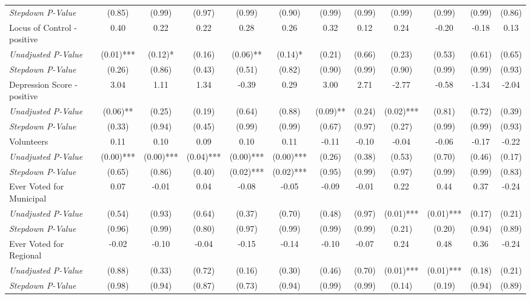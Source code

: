 \begin{tabular}{l c c c c c c c c c c c}
\quad \textit{Stepdown P-Value} & (0.85) & (0.99) & (0.97) & (0.99) & (0.90) & (0.99) & (0.99) & (0.99) & (0.99) & (0.99) & (0.86) \\
Locus of Control - positive & 0.40 & 0.22 & 0.22 & 0.28 & 0.26 & 0.32 & 0.12 & 0.24 & -0.20 & -0.18 & 0.13 \\
\quad \textit{Unadjusted P-Value} & (0.01)*** & (0.12)* & (0.16) & (0.06)** & (0.14)* & (0.21) & (0.66) & (0.23) & (0.53) & (0.61) & (0.65) \\
\quad \textit{Stepdown P-Value} & (0.26) & (0.86) & (0.43) & (0.51) & (0.82) & (0.90) & (0.99) & (0.90) & (0.99) & (0.99) & (0.93) \\
Depression Score - positive & 3.04 & 1.11 & 1.34 & -0.39 & 0.29 & 3.00 & 2.71 & -2.77 & -0.58 & -1.34 & -2.04 \\
\quad \textit{Unadjusted P-Value} & (0.06)** & (0.25) & (0.19) & (0.64) & (0.88) & (0.09)** & (0.24) & (0.02)*** & (0.81) & (0.72) & (0.39) \\
\quad \textit{Stepdown P-Value} & (0.33) & (0.94) & (0.45) & (0.99) & (0.99) & (0.67) & (0.97) & (0.27) & (0.99) & (0.99) & (0.93) \\
Volunteers & 0.11 & 0.10 & 0.09 & 0.10 & 0.11 & -0.11 & -0.10 & -0.04 & -0.06 & -0.17 & -0.22 \\
\quad \textit{Unadjusted P-Value} & (0.00)*** & (0.00)*** & (0.04)*** & (0.00)*** & (0.00)*** & (0.26) & (0.38) & (0.53) & (0.70) & (0.46) & (0.17) \\
\quad \textit{Stepdown P-Value} & (0.65) & (0.86) & (0.40) & (0.02)*** & (0.02)*** & (0.95) & (0.99) & (0.97) & (0.99) & (0.99) & (0.83) \\
Ever Voted for Municipal & 0.07 & -0.01 & 0.04 & -0.08 & -0.05 & -0.09 & -0.01 & 0.22 & 0.44 & 0.37 & -0.24 \\
\quad \textit{Unadjusted P-Value} & (0.54) & (0.93) & (0.64) & (0.37) & (0.70) & (0.48) & (0.97) & (0.01)*** & (0.01)*** & (0.17) & (0.21) \\
\quad \textit{Stepdown P-Value} & (0.96) & (0.99) & (0.80) & (0.97) & (0.99) & (0.99) & (0.99) & (0.21) & (0.20) & (0.94) & (0.89) \\
Ever Voted for Regional & -0.02 & -0.10 & -0.04 & -0.15 & -0.14 & -0.10 & -0.07 & 0.24 & 0.48 & 0.36 & -0.24 \\
\quad \textit{Unadjusted P-Value} & (0.88) & (0.33) & (0.72) & (0.16) & (0.30) & (0.46) & (0.70) & (0.01)*** & (0.01)*** & (0.18) & (0.21) \\
\quad \textit{Stepdown P-Value} & (0.98) & (0.94) & (0.87) & (0.73) & (0.94) & (0.99) & (0.99) & (0.14) & (0.19) & (0.94) & (0.89) \\

\end{tabular}
